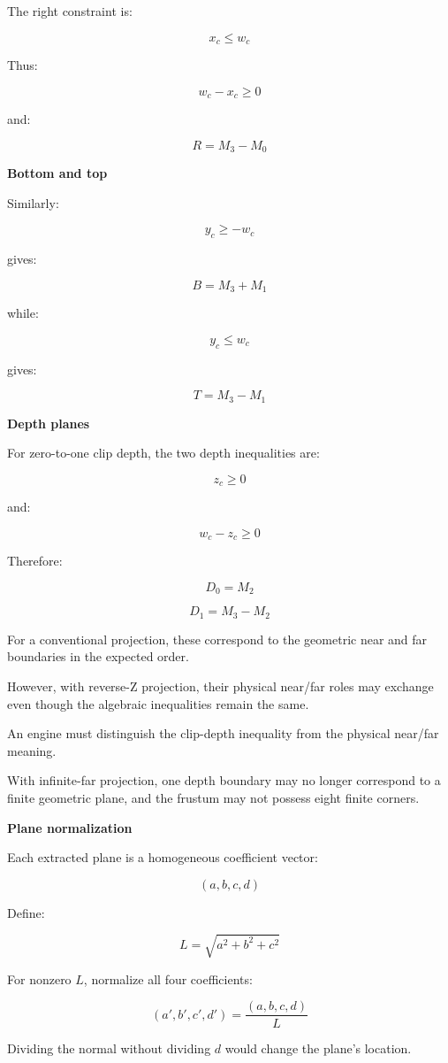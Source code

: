 The right constraint is:

\[
x_c\le w_c
\]

Thus:

\[
w_c-x_c\ge0
\]

and:

\[
\boxed{R=M_3-M_0}
\]

\textbf{Bottom and top}

Similarly:

\[
y_c\ge-w_c
\]

gives:

\[
\boxed{B=M_3+M_1}
\]

while:

\[
y_c\le w_c
\]

gives:

\[
\boxed{T=M_3-M_1}
\]

\textbf{Depth planes}

For zero-to-one clip depth, the two depth inequalities are:

\[
z_c\ge0
\]

and:

\[
w_c-z_c\ge0
\]

Therefore:

\[
\boxed{D_0=M_2}
\]

\[
\boxed{D_1=M_3-M_2}
\]

For a conventional projection, these correspond to the geometric near and far boundaries in the expected order.

However, with reverse-Z projection, their physical near/far roles may exchange even though the algebraic inequalities remain the same.

An engine must distinguish the clip-depth inequality from the physical near/far meaning.

With infinite-far projection, one depth boundary may no longer correspond to a finite geometric plane, and the frustum may not possess eight finite corners.

\textbf{Plane normalization}

Each extracted plane is a homogeneous coefficient vector:

\[
(a,b,c,d)
\]

Define:

\[
L=\sqrt{a^2+b^2+c^2}
\]

For nonzero \(L\), normalize all four coefficients:

\[
(a',b',c',d')= \frac{(a,b,c,d)}{L}
\]

Dividing the normal without dividing \(d\) would change the plane's location.

